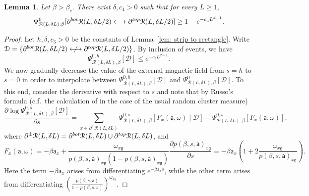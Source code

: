\documentclass[11pt,a4paper]{article}
\newtheorem{lemma}[theorem]{Lemma}
\theoremstyle{definition}
\numberwithin{equation}{section}
\newcommand\fg{\mathfrak{g}}
\begin{document}
\begin{lemma}\label{lem: large to free bc} Let $\beta>\beta_c$. There exist $\delta,c_4>0$ such that for every $L \geq 1$,
\begin{equation}\label{eq: large to free bc}
\Psi^0_{\mathcal R(L,\delta L),\beta}[ \partial^{\rm bot} \mathcal R(L, \delta L/2) \longleftrightarrow \partial^{\rm top} \mathcal R(L, \delta L/2)] \geq 1 - e^{-c_4 L^{d-1}}. 
\end{equation}
\end{lemma}


\begin{proof}
Let $h,\delta,c_3>0$ be the constants of Lemma~\ref{lem: strip to rectangle}.   
Write $\mathcal{D}=\{\partial^{\rm bot} \mathcal R(L, \delta L/2) \centernot\longleftrightarrow \partial^{\rm top} \mathcal R(L, \delta L/2)\}$.
By inclusion of events, we have 
   \begin{equation}\label{eq:mixed_b.c.}
   \Psi^{0,h}_{\mathcal R(L,\delta L),\beta}[\mathcal{D}] \leq e^{-c_3L^{d-1}}.
   \end{equation}
We now gradually decrease the value of the external magnetic field from $s=h$ to $s=0$ in order to interpolate between $\Psi^{0,h}_{\mathcal R(L,\delta L),\beta}[ \mathcal{D} ]$ and $\Psi^{0}_{\mathcal R(L,\delta L),\beta}[ \mathcal{D} ]$.
To this end, consider the derivative with respect to $s$ and note that by Russo's formula (c.f.\ the calculation of \cite[Theorem~(2.43)]{Grimmett2006RCM} in the case of the usual random cluster measure)
\begin{equation} \label{eq: log derivative}
\frac{\partial \log \Psi^{0,s}_{\mathcal R(L,\delta L),\beta}[ \mathcal{D} ]}{\partial s}= \sum_{x\in \partial^{\pm}\mathcal{R}(L,\delta L)} \Psi^{0,s}_{\mathcal R(L,\delta L),\beta}\left[F_x(\mathsf{a},\omega) \mid  \mathcal{D}\right] -\Psi^{0,s}_{\mathcal R(L,\delta L),\beta}\left[F_x(\mathsf{a},\omega)\right],
\end{equation}
where $\partial^{\pm}\mathcal{R}(L,\delta L)=\partial^{\rm bot}\mathcal{R}(L,\delta L)\cup \partial^{\rm top}\mathcal{R}(L,\delta L)$, and
\begin{equation}
F_x(\mathsf{a},\omega)=-\beta \mathsf{a}_x+\frac{\omega_{x\fg}}{p(\beta,s,\mathsf{a})_{x\fg}(1-p(\beta,s,\mathsf{a})_{x\fg})} \frac{\partial p(\beta,s,\mathsf{a})_{x\fg}}{\partial s}=-\beta\mathsf{a}_x\left(1+2\frac{\omega_{x\fg}}{p(\beta,s,\mathsf{a})_{x\fg}}\right).
\end{equation}
Here the term $-\beta \mathsf{a}_x$ arises from differentiating $e^{-\beta \mathsf{a}_x s}$, while the other term arises from differentiating $\left(\frac{p(\beta,s,\mathsf{a})}{1-p(\beta,s,\mathsf{a})}\right)^{\omega_{xg}}$.



\end{proof}
\end{document}
